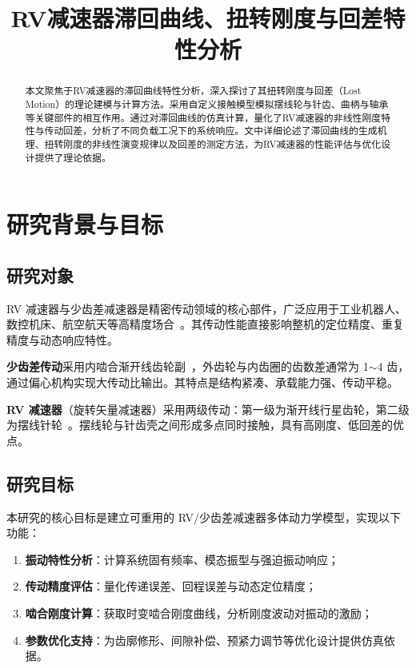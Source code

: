 \documentclass[12pt]{ctexart}
\title{\bfseries RV减速器滞回曲线、扭转刚度与回差特性分析}
\author{}
\date{}
\begin{document}
\maketitle

\begin{abstract}
本文聚焦于RV减速器的滞回曲线特性分析，深入探讨了其扭转刚度与回差（Lost Motion）的理论建模与计算方法。采用自定义接触模型模拟摆线轮与针齿、曲柄与轴承等关键部件的相互作用。通过对滞回曲线的仿真计算，量化了RV减速器的非线性刚度特性与传动回差，分析了不同负载工况下的系统响应。文中详细论述了滞回曲线的生成机理、扭转刚度的非线性演变规律以及回差的测定方法，为RV减速器的性能评估与优化设计提供了理论依据。
\end{abstract}

\tableofcontents
\newpage

\section{研究背景与目标}

\subsection{研究对象}
RV 减速器与少齿差减速器是精密传动领域的核心部件，广泛应用于工业机器人、数控机床、航空航天等高精度场合~\cite{rvdynamic,rvfree}。其传动性能直接影响整机的定位精度、重复精度与动态响应特性。

\textbf{少齿差传动}采用内啮合渐开线齿轮副~\cite{litvin}，外齿轮与内齿圈的齿数差通常为 1$\sim$4 齿，通过偏心机构实现大传动比输出。其特点是结构紧凑、承载能力强、传动平稳。

\textbf{RV 减速器}（旋转矢量减速器）采用两级传动：第一级为渐开线行星齿轮，第二级为摆线针轮~\cite{cycloidmodel,cycloidltca}。摆线轮与针齿壳之间形成多点同时接触，具有高刚度、低回差的优点。

\subsection{研究目标}
本研究的核心目标是建立可重用的 RV/少齿差减速器多体动力学模型，实现以下功能：
\begin{enumerate}
  \item \textbf{振动特性分析}：计算系统固有频率、模态振型与强迫振动响应；
  \item \textbf{传动精度评估}：量化传递误差、回程误差与动态定位精度；
  \item \textbf{啮合刚度计算}：获取时变啮合刚度曲线，分析刚度波动对振动的激励；
  \item \textbf{参数优化支持}：为齿廓修形、间隙补偿、预紧力调节等优化设计提供仿真依据。
\end{enumerate}
\end{document}
